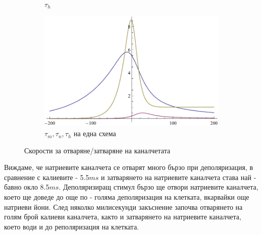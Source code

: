 \documentclass{article}
\numberwithin{equation}{section}
\begin{document}
\begin{figure}[H]
\begin{subfigure}[t]{0.3\textwidth}
            \caption{$\tau_h$}
        \end{subfigure}
        \begin{subfigure}[t]{0.3\textwidth}
            \includegraphics[width=\textwidth]{./schemas/tcomb.pdf}
            \caption{$ \tau_m, \tau_n, \tau_h$ на една схема}
        \end{subfigure}
        \caption{Скорости за отваряне/затваряне на каналчетата}\label{fig:chanel_prob}
    \end{figure}
    Виждаме, че натриевите каналчета се отварят много бързо при деполяризация, в сравнение с калиевите - 5.5$ms$ и затварянето на
    натриевите каналчета става най - бавно окло 8.5$ms$. Деполяризиращ стимул бързо ще отвори натриевите каналчета, което ще доведе до още
    по - голяма деполяризация на клетката, вкарвайки още натриеви йони. След няколко милисекунди закъснение започва отварянето на голям брой калиеви каналчета, както и затварянето на натриевите каналчета, което води и до реполяризация на клетката.
    
\end{document}
